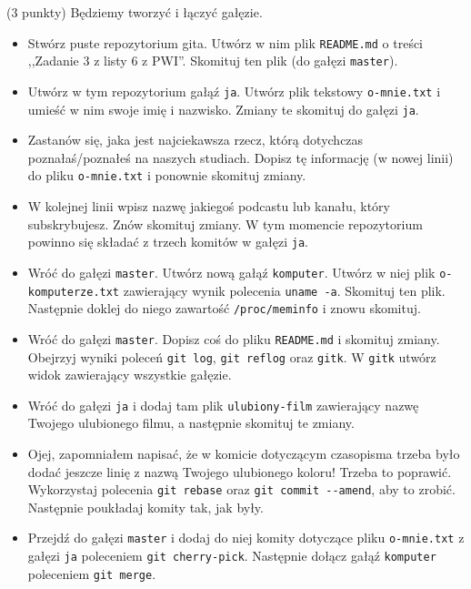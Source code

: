 \begin{zadanie} (3 punkty) Będziemy tworzyć i łączyć gałęzie.
\begin{itemize} 
\item 
Stwórz puste repozytorium gita.
Utwórz w nim plik \verb+README.md+ o treści ,,Zadanie 3 z listy 6 z PWI''. Skomituj ten plik (do gałęzi \verb+master+).

\item Utwórz w tym repozytorium gałąź \verb+ja+. Utwórz plik tekstowy \verb+o-mnie.txt+ i umieść w nim swoje imię i nazwisko. Zmiany te skomituj do gałęzi \verb+ja+.

\item Zastanów się, jaka jest najciekawsza rzecz, którą dotychczas poznałaś/poznałeś na naszych studiach. Dopisz tę informację (w nowej linii) do pliku \verb+o-mnie.txt+ i ponownie skomituj zmiany.

\item W kolejnej linii wpisz nazwę jakiegoś podcastu lub kanału, który subskrybujesz. Znów skomituj zmiany. W tym momencie repozytorium powinno się składać z trzech komitów w gałęzi \verb+ja+. 

\item  Wróć do gałęzi \verb+master+. Utwórz nową gałąź \verb+komputer+. Utwórz w niej plik \verb+o-komputerze.txt+ zawierający wynik polecenia \verb+uname -a+. Skomituj ten plik. Następnie doklej do niego zawartość \verb+/proc/meminfo+ i znowu skomituj.

\item Wróć do gałęzi \verb+master+. Dopisz coś do pliku \verb+README.md+ i skomituj zmiany. Obejrzyj wyniki poleceń  \verb+git log+, \verb+git reflog+ oraz \verb+gitk+. W \verb+gitk+ utwórz widok zawierający wszystkie gałęzie.

\item Wróć do gałęzi \verb+ja+ i dodaj tam plik \verb+ulubiony-film+ zawierający nazwę Twojego ulubionego filmu, a następnie skomituj te zmiany.

\item Ojej, zapomniałem napisać, że w komicie dotyczącym czasopisma trzeba było dodać jeszcze linię z nazwą Twojego ulubionego koloru! Trzeba to poprawić. Wykorzystaj polecenia \verb+git rebase+ oraz \verb+git commit --amend+, aby to zrobić. Następnie poukładaj komity tak, jak były.

\item Przejdź do gałęzi \verb+master+ i dodaj do niej komity dotyczące pliku \verb+o-mnie.txt+ z gałęzi \verb+ja+ poleceniem \verb+git cherry-pick+. Następnie dołącz gałąź \verb+komputer+ poleceniem \verb+git merge+.


\end{itemize}
\end{zadanie}
